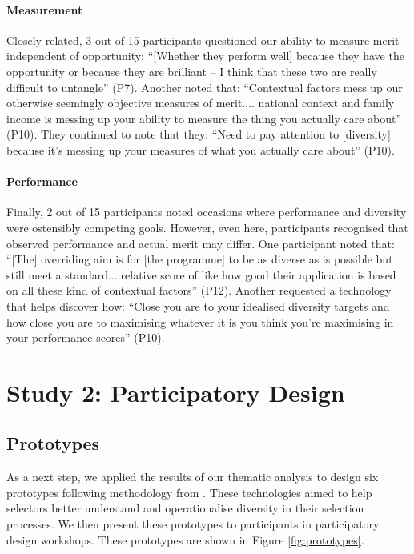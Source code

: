 \paragraph{Measurement}
Closely related, 3 out of 15 participants questioned our ability to measure merit independent of opportunity: ``[Whether they perform well] because they have the opportunity or because they are brilliant – I think that these two are really difficult to untangle'' (P7). Another noted that: ``Contextual factors mess up our otherwise seemingly objective measures of merit.... national context and family income is messing up your ability to measure the thing you actually care about'' (P10). They continued to note that they: ``Need to pay attention to [diversity] because it's messing up your measures of what you actually care about'' (P10).

\paragraph{Performance}
Finally, 2 out of 15 participants noted occasions where performance and diversity were ostensibly competing goals. However, even here, participants recognised that observed performance and actual merit may differ. One participant noted that: ``[The] overriding aim is for [the programme] to be as diverse as is possible but still meet a standard....relative score of like how good their application is based on all these kind of contextual factors'' (P12). Another requested a technology that helps discover how: ``Close you are to your idealised diversity targets and how close you are to maximising whatever it is you think you're maximising in your performance scores'' (P10).

\section[Study 2]{Study 2: Participatory Design}\label{sec:study2}
\subsection{Prototypes}
As a next step, we applied the results of our thematic analysis to design six prototypes following methodology from \textcite{Buchenau_Suri_2000}. These technologies aimed to help selectors better understand and operationalise diversity in their selection processes. We then present these prototypes to participants in participatory design workshops. These prototypes are shown in Figure \ref{fig:prototypes}.

